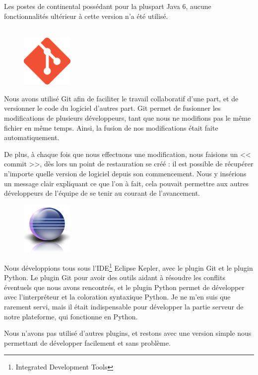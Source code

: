 Les postes de continental possédant pour la pluspart Java 6, aucune fonctionnalités ultérieur à cette version n'a été utilisé.\\~

\newpage
\begin{figure}
	\includegraphics[width=2.5cm]{contents/images/logoGit.png}
\end{figure}
Nous avons utilisé Git afin de faciliter le travail collaboratif d'une part, et de versionner le code du logiciel d'autres part. Git permet de fusionner les modifications de plusieurs développeurs, tant que nous ne modifions pas le même fichier en même temps. Ainsi, la fusion de nos modifications était faite automatiquement. 

De plus, à chaque fois que nous effectuons une modification, nous faisions un << commit >>, dès lors un point de restauration se créé : il est possible de récupérer n'importe quelle version de logiciel depuis son commencement. Nous y insérions un message clair expliquant ce que l'on à fait, cela pouvait permettre aux autres développeurs de l'équipe de se tenir au courant de l'avancement.

\begin{figure}
	\includegraphics[width=2.5cm]{contents/images/logoEclipse.png}
\end{figure}
Nous développions tous sous l'IDE\footnote{Integrated Development Tools} Eclipse Kepler, avec le plugin Git et le plugin Python. Le plugin Git pour avoir des outils aidant à résoudre les conflits éventuels que nous avons rencontrés, et le plugin Python permet de développer avec l'interpréteur et la coloration syntaxique Python. Je ne m'en suis que rarement servi, mais il était indispensable pour développer la partie serveur de notre plateforme, qui fonctionne en Python.

Nous n'avons pas utilisé d'autres plugins, et restons avec une version simple nous permettant de développer facilement et sans problème.

